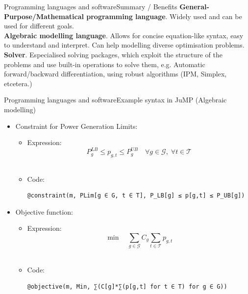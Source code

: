 \documentclass[handout]{beamer}
\begin{document}
\begin{frame}[t]{Programming languages and software}{Summary / Benefits}
\textbf{General-Purpose/Mathematical programming language}. Widely used and can be used for different goals.\\[6pt]

\textbf{Algebraic modelling language}. Allows for concise equation-like syntax, easy to understand and interpret. Can help modelling diverse optimisation problems.\\[6pt]

\textbf{Solver}. Especialised solving packages, which exploit the structure of the problems and use built-in operations to solve them, e.g. Automatic forward/backward differentiation, using robust algorithms (IPM, Simplex, etcetera.)
\end{frame}


\begin{frame}[t,fragile]{Programming languages and software}{Example syntax in JuMP (Algebraic modelling)}
\begin{itemize}
\item Constraint for Power Generation Limits:
\begin{itemize}
  \item Expression:
  $$P^{LB}_g \leq p_{g,t} \leq  P^{UB}_g \quad \forall g \in \mathcal{G},\; \forall t \in \mathcal{T}$$\\
  \item Code:
  \hspace{-1.5cm}\begin{Verbatim}[fontsize=\scriptsize]
    @constraint(m, PLim[g ∈ G, t ∈ T], P_LB[g] ≤ p[g,t] ≤ P_UB[g])
  \end{Verbatim}
\end{itemize}\vspace{12pt}
\item Objective function:
\begin{itemize}
  \item Expression:
  $$\min \quad \sum_{g \in \mathcal{G}} C_g \sum_{t \in \mathcal{T}} p_{g,t}$$\\
  \item Code:
  \hspace{-1.5cm}\begin{Verbatim}[fontsize=\scriptsize]
    @objective(m, Min, ∑(C[g]*∑(p[g,t] for t ∈ T) for g ∈ G))
  \end{Verbatim}
\end{itemize}

\end{itemize}

\end{frame}
\end{document}
